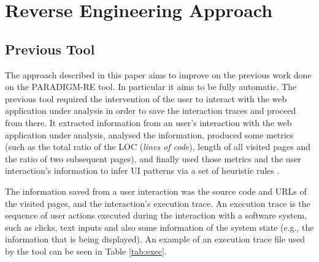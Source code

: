 \documentclass[10pt, conference, compsocconf]{IEEEtran}
\begin{document}
\section{Reverse Engineering Approach}\label{sec:re}

\subsection{Previous Tool}\label{sec:prev}

The  approach described in this paper aims to improve on the previous work \cite{nabuco2013inferring} done on the PARADIGM-RE tool. In particular it aims to be fully automatic. The previous tool required the intervention of the user to interact with the web application under analysis in order to save the interaction traces and proceed from there. It extracted information from an user's interaction with the web application under analysis, analysed the information, produced some metrics (such as the total ratio of the LOC (\textit{lines of code}), length of all visited pages and the ratio of two subsequent pages), and finally used those metrics and the user interaction's information to infer UI patterns via a set of heuristic rules \cite{nabuco2013inferring}. 

The information saved from a user interaction was the source code and URLs of the visited pages, and the interaction's execution trace. An execution trace is the sequence of user actions executed during the interaction with a software system, such as clicks, text inputs and also some information of the system state (e.g., the information that is being displayed). An example of an execution trace file used by the tool can be seen in Table \ref{tab:exec}.
\end{document}
